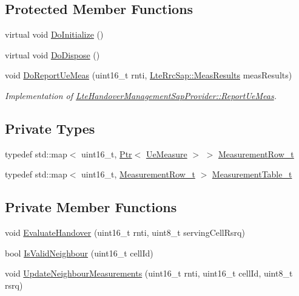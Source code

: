 \subsection*{Protected Member Functions}
\begin{DoxyCompactItemize}
\item 
virtual void \hyperlink{classns3_1_1A2A4RsrqHandoverAlgorithm_a47e9fb10c8dacf9d2b6cae95a3fe1a5c}{Do\+Initialize} ()
\item 
virtual void \hyperlink{classns3_1_1A2A4RsrqHandoverAlgorithm_a3da521192195d0401eb49c275ca70174}{Do\+Dispose} ()
\item 
void \hyperlink{classns3_1_1A2A4RsrqHandoverAlgorithm_a49d20f578c2853426103a532e9f862ec}{Do\+Report\+Ue\+Meas} (uint16\+\_\+t rnti, \hyperlink{structns3_1_1LteRrcSap_1_1MeasResults}{Lte\+Rrc\+Sap\+::\+Meas\+Results} meas\+Results)
\begin{DoxyCompactList}\small\item\em Implementation of \hyperlink{classns3_1_1LteHandoverManagementSapProvider_a5daca6a055e4f8794f7f1e8ba1077b15}{Lte\+Handover\+Management\+Sap\+Provider\+::\+Report\+Ue\+Meas}. \end{DoxyCompactList}\end{DoxyCompactItemize}
\subsection*{Private Types}
\begin{DoxyCompactItemize}
\item 
typedef std\+::map$<$ uint16\+\_\+t, \hyperlink{classns3_1_1Ptr}{Ptr}$<$ \hyperlink{classns3_1_1A2A4RsrqHandoverAlgorithm_1_1UeMeasure}{Ue\+Measure} $>$ $>$ \hyperlink{classns3_1_1A2A4RsrqHandoverAlgorithm_a36b466ab32bda84bd5a6c0843608ab2a}{Measurement\+Row\+\_\+t}
\item 
typedef std\+::map$<$ uint16\+\_\+t, \hyperlink{classns3_1_1A2A4RsrqHandoverAlgorithm_a36b466ab32bda84bd5a6c0843608ab2a}{Measurement\+Row\+\_\+t} $>$ \hyperlink{classns3_1_1A2A4RsrqHandoverAlgorithm_a27c0f07941cacc1c54a799a27ea7821c}{Measurement\+Table\+\_\+t}
\end{DoxyCompactItemize}
\subsection*{Private Member Functions}
\begin{DoxyCompactItemize}
\item 
void \hyperlink{classns3_1_1A2A4RsrqHandoverAlgorithm_a95414290544e888109dd5cbb5c022512}{Evaluate\+Handover} (uint16\+\_\+t rnti, uint8\+\_\+t serving\+Cell\+Rsrq)
\item 
bool \hyperlink{classns3_1_1A2A4RsrqHandoverAlgorithm_a6d9106afebe16783ac637e9672a2fae1}{Is\+Valid\+Neighbour} (uint16\+\_\+t cell\+Id)
\item 
void \hyperlink{classns3_1_1A2A4RsrqHandoverAlgorithm_a789156746868d391bf23b1b185a3e328}{Update\+Neighbour\+Measurements} (uint16\+\_\+t rnti, uint16\+\_\+t cell\+Id, uint8\+\_\+t rsrq)
\end{DoxyCompactItemize}
